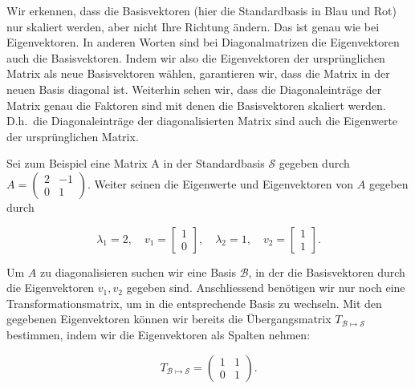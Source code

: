 \vspace{0.25\baselineskip}

Wir erkennen, dass die Basisvektoren (hier die Standardbasis in Blau und Rot) nur skaliert werden, aber nicht Ihre Richtung ändern. Das ist genau wie bei Eigenvektoren. In anderen Worten sind bei Diagonalmatrizen die Eigenvektoren auch die Basisvektoren. Indem wir also die Eigenvektoren der ursprünglichen Matrix als neue Basisvektoren wählen, garantieren wir, dass die Matrix in der neuen Basis diagonal ist. Weiterhin sehen wir, dass die Diagonaleinträge der Matrix genau die Faktoren sind mit denen die Basisvektoren skaliert werden. D.h.\ die Diagonaleinträge der diagonalisierten Matrix sind auch die Eigenwerte der ursprünglichen Matrix.

\vspace{1\baselineskip}

Sei zum Beispiel eine Matrix A in der Standardbasis \( \mathcal{S} \) gegeben durch \( A = \begin{pmatrix} 2 & -1 \\ 0 & 1 \end{pmatrix} \). Weiter seinen die Eigenwerte und Eigenvektoren von \( A \) gegeben durch

\begin{equation*}
    \lambda_1 = 2, \quad v_1 = \begin{bmatrix} 1 \\ 0 \end{bmatrix}, \quad \lambda_2 = 1, \quad v_2 = \begin{bmatrix} 1 \\ 1 \end{bmatrix}.
\end{equation*}

Um \( A \) zu diagonalisieren suchen wir eine Basis \( \mathcal{B} \), in der die Basisvektoren durch die Eigenvektoren \( v_1, v_2 \) gegeben sind. Anschliessend benötigen wir nur noch eine Transformationsmatrix, um in die entsprechende Basis zu wechseln. Mit den gegebenen Eigenvektoren können wir bereits die Übergangsmatrix \( T_{\mathcal{B} \mapsto \mathcal{S} } \) bestimmen, indem wir die Eigenvektoren als Spalten nehmen:

\begin{equation*}
    T_{\mathcal{B} \mapsto \mathcal{S} } = \begin{pmatrix} 1 & 1 \\ 0 & 1 \end{pmatrix}.
\end{equation*}

